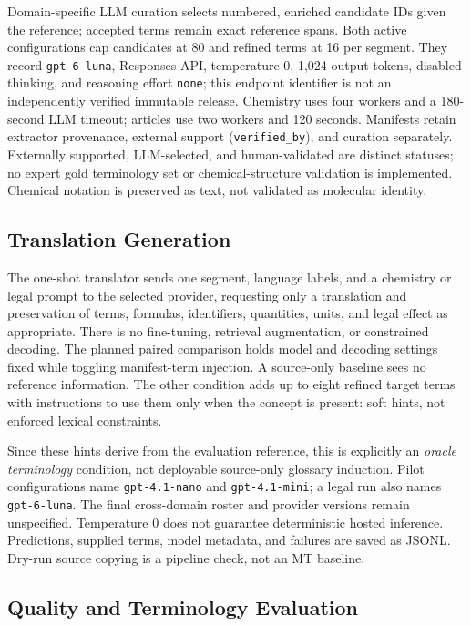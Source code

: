 Domain-specific LLM curation selects numbered, enriched candidate IDs given the reference;
accepted terms remain exact reference spans. Both active configurations cap candidates at 80 and
refined terms at 16 per segment. They record \texttt{gpt-6-luna}, Responses API, temperature 0,
1,024 output tokens, disabled thinking, and reasoning effort \texttt{none}; this endpoint identifier
is not an independently verified immutable release. Chemistry uses four workers and a 180-second
LLM timeout; articles use two workers and 120 seconds. Manifests retain extractor provenance,
external support (\texttt{verified\_by}), and curation separately. Externally supported, LLM-selected,
and human-validated are distinct statuses; no expert gold terminology set or chemical-structure
validation is implemented. Chemical notation is preserved as text, not validated as molecular identity.

\subsection{Translation Generation}
\label{sec:generation}

The one-shot translator sends one segment, language labels, and a chemistry or legal prompt to
the selected provider, requesting only a translation and preservation of terms, formulas,
identifiers, quantities, units, and legal effect as appropriate. There is no fine-tuning,
retrieval augmentation, or constrained decoding. The planned paired comparison holds model and
decoding settings fixed while toggling manifest-term injection. A source-only baseline sees no
reference information. The other condition adds up to eight refined target terms with instructions
to use them only when the concept is present: soft hints, not enforced lexical constraints.

Since these hints derive from the evaluation reference, this is explicitly an \emph{oracle
terminology} condition, not deployable source-only glossary induction. Pilot configurations name
\texttt{gpt-4.1-nano} and \texttt{gpt-4.1-mini}; a legal run also names \texttt{gpt-6-luna}.
The final cross-domain roster and provider versions remain unspecified. Temperature 0 does not
guarantee deterministic hosted inference. Predictions, supplied terms, model metadata, and failures
are saved as JSONL. Dry-run source copying is a pipeline check, not an MT baseline.

\subsection{Quality and Terminology Evaluation}
\label{sec:evaluation}

